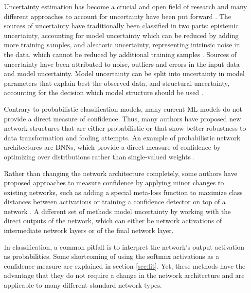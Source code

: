 \documentclass[10pt]{article}
\begin{document}
Uncertainty estimation has become a crucial and open field of research and many different approaches to account for uncertainty have been put forward \cite{Gal2016Uncertainty, Choi2017UncertaintyAwareLF, KendallG17, subramanya, leibig2017, Sun2018KSconfA}. The sources of uncertainty have traditionally been classified in two parts: epistemic uncertainty, accounting for model uncertainty which can be reduced by adding more training samples, and aleatoric uncertainty, representing intrinsic noise in the data, which cannot be reduced by additional training samples \cite{KendallG17}.  Sources of uncertainty have been attributed to noise, outliers and errors in the input data and model uncertainty. Model uncertainty can be split into uncertainty in model parameters that explain best the observed data, and structural uncertainty, accounting for the decision which model structure should be used \cite{Hammer2007HowTP, Gal2016Uncertainty}.

Contrary to probabilistic classification models, many current \gls{ML} models do not provide a direct measure of confidence. Thus, many authors have proposed new network structures that are either probabilistic or that show better robustness to data transformation and fooling attempts. An example of probabilistic network architectures are \glspl{BNN}, which provide a direct measure of confidence by optimizing over distributions rather than single-valued weights \cite{Gal2016Uncertainty, KendallG17}.

Rather than changing the network architecture completely, some authors have proposed approaches to measure confidence by applying minor changes to existing networks, such as adding a special meta-loss function to maximize class distances between activations \cite{mandelbaum17} or training a confidence detector on top of a network \cite{Bahat_2018}. A different set of methods model uncertainty by working with the direct outputs of the network, which can either be network activations of intermediate network layers or of the final network layer. 

In classification, a common pitfall is to interpret the network's output activation as probabilities. Some shortcoming of using the softmax activations as a confidence measure are explained in section \ref{sec:lit}. Yet, these methods have the advantage that they do not require a change in the network architecture and are applicable to many different standard network types.
\end{document}
